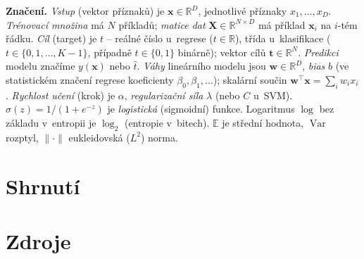 \documentclass[11pt,a4paper]{article}
\DeclareMathOperator{\Var}{Var}
\begin{document}
\medskip
\noindent\textbf{Značení.} \emph{Vstup} (vektor příznaků) je $\mathbf{x}\in\mathbb{R}^D$, jednotlivé příznaky $x_1,\dots,x_D$. \emph{Trénovací množina} má $N$ příkladů; \emph{matice dat} $\mathbf{X}\in\mathbb{R}^{N\times D}$ má příklad $\mathbf{x}_i$ na $i$-tém řádku. \emph{Cíl} (target) je $t$ -- reálné číslo u~regrese ($t\in\mathbb{R}$), třída u~klasifikace ($t\in\{0,1,\dots,K-1\}$, případně $t\in\{0,1\}$ binárně); vektor cílů $\mathbf{t}\in\mathbb{R}^N$. \emph{Predikci} modelu značíme $y(\mathbf{x})$ nebo $\hat{t}$. \emph{Váhy} lineárního modelu jsou $\mathbf{w}\in\mathbb{R}^D$, \emph{bias} $b$ (ve statistickém značení regrese koeficienty $\beta_0,\beta_1,\dots$); skalární součin $\mathbf{w}^{\!\top}\mathbf{x}=\sum_i w_i x_i$. \emph{Rychlost učení} (krok) je $\alpha$, \emph{regularizační síla} $\lambda$ (nebo $C$ u~SVM). $\sigma(z)=1/(1+e^{-z})$ je \emph{logistická} (sigmoidní) funkce. Logaritmus $\log$ bez základu v~entropii je $\log_2$ (entropie v~bitech). $\mathbb{E}$ je střední hodnota, $\Var$ rozptyl, $\|\cdot\|$ eukleidovská ($L^2$) norma.












\section*{Shrnutí}


\section*{Zdroje}
\end{document}
